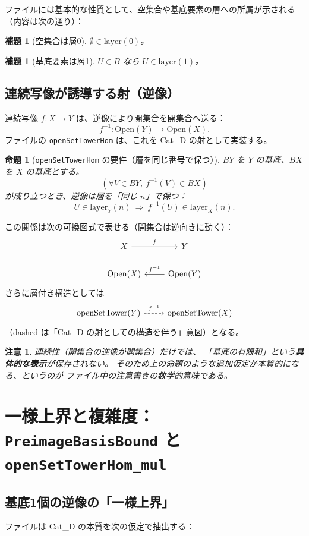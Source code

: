 \documentclass[a4paper,11pt]{article}
\newtheorem{lemma}[definition]{補題}
\newtheorem{proposition}[definition]{命題}
\newtheorem{remark}[definition]{注意}
\begin{document}
ファイルには基本的な性質として、空集合や基底要素の層への所属が示される（内容は次の通り）：
\begin{lemma}[空集合は層0]
$\emptyset \in \mathrm{layer}(0)$。
\end{lemma}
\begin{lemma}[基底要素は層1]
$U\in B$ なら $U\in \mathrm{layer}(1)$。
\end{lemma}

\subsection{連続写像が誘導する射（逆像）}
連続写像 $f:X\to Y$ は、逆像により開集合を開集合へ送る：
\[
f^{-1}:\mathrm{Open}(Y)\longrightarrow \mathrm{Open}(X).
\]
ファイルの \texttt{openSetTowerHom} は、これを Cat\_D の射として実装する。

\begin{proposition}[\texttt{openSetTowerHom} の要件（層を同じ番号で保つ）]
$BY$ を $Y$ の基底、$BX$ を $X$ の基底とする。
\[
(\forall V\in BY,\ f^{-1}(V)\in BX)
\]
が成り立つとき、逆像は層を「同じ $n$」で保つ：
\[
U\in \mathrm{layer}_Y(n)\ \Rightarrow\ f^{-1}(U)\in \mathrm{layer}_X(n).
\]
\end{proposition}

この関係は次の可換図式で表せる（開集合は逆向きに動く）：
\[
\begin{tikzcd}
X \arrow[r,"f"] & Y \\
\mathrm{Open}(X) & \mathrm{Open}(Y) \arrow[l,"f^{-1}"']
\end{tikzcd}
\]
さらに層付き構造としては
\[
\begin{tikzcd}
\mathrm{openSetTower}(Y) \arrow[r, dashed, "f^{-1}"] & \mathrm{openSetTower}(X)
\end{tikzcd}
\]
（dashed は「Cat\_D の射としての構造を伴う」意図）となる。

\begin{remark}
連続性（開集合の逆像が開集合）だけでは、
「基底の有限和」という\textbf{具体的な表示}が保存されない。
そのため上の命題のような追加仮定が本質的になる、というのが
ファイル中の注意書きの数学的意味である。
\end{remark}

\section{一様上界と複雑度：\texttt{PreimageBasisBound} と \texttt{openSetTowerHom\_mul}}

\subsection{基底1個の逆像の「一様上界」}
ファイルは Cat\_D の本質を次の仮定で抽出する：
\end{document}
